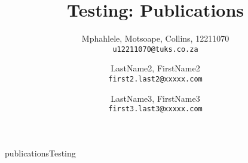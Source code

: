 \documentclass[a4paper]{article}
\title{Testing: Publications}
\author{
	Mphahlele, Motsoape, Collins, 12211070\\
	\texttt{u12211070@tuks.co.za}
	\and
	LastName2, FirstName2\\
	\texttt{first2.last2@xxxxx.com}
	\and
	LastName3, FirstName3\\
	\texttt{first3.last3@xxxxx.com}
}
\begin{document}
\maketitle
\newpage
\tableofcontents

\newpage
{publicationsTesting}



\end{document}
